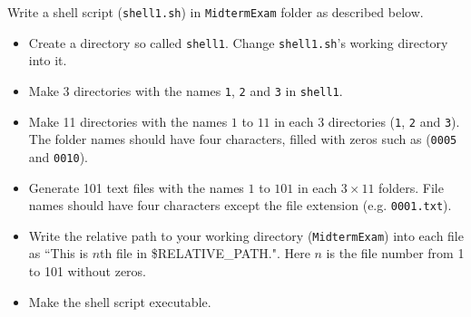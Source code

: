 \newpage
\question[25]  

Write a shell script (\texttt{shell1.sh}) in \texttt{MidtermExam} folder as described below.
\begin{itemize}
\item Create a directory so called \texttt{shell1}. Change \texttt{shell1.sh}'s working directory into it.
\item Make 3 directories with the names \texttt{1}, \texttt{2} and \texttt{3} in \texttt{shell1}.
\item Make 11 directories with the names $1$ to $11$ in each $3$ directories (\texttt{1}, \texttt{2} and \texttt{3}). The folder names should have four characters, filled with zeros such as (\texttt{0005} and \texttt{0010}). 
\item Generate 101 text files with the names $1$ to $101$ in each $3\times11$ folders. File names should have four characters except the file extension (e.g. \texttt{0001.txt}).
\item Write the relative path to your working directory (\texttt{MidtermExam}) into each file as ``This is $n$th file in \$RELATIVE\_PATH.". Here $n$ is the file number from 1 to 101 without zeros.
\item Make the shell script executable.
\end{itemize}

